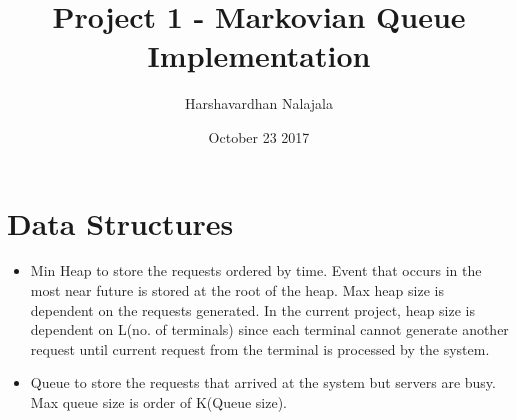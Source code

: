 \documentclass[11pt]{article}
\title{Project 1 - Markovian Queue Implementation}
\author{Harshavardhan Nalajala}
\date{October 23 2017}
\begin{document}
\maketitle
 \tableofcontents
 
 \section{Data Structures }
 \begin{itemize}
 \item Min Heap to store the requests ordered by time. Event that occurs in the most near future is stored at the root of the heap. Max heap size is dependent on the requests generated.
 In the current project, heap size is dependent on L(no. of terminals) since each terminal cannot generate another request until current request from the terminal is processed by the system.
 \item Queue to store the requests that arrived at the system but servers are busy. Max queue size is order of K(Queue size).
 \end{itemize}
 
\end{document}
